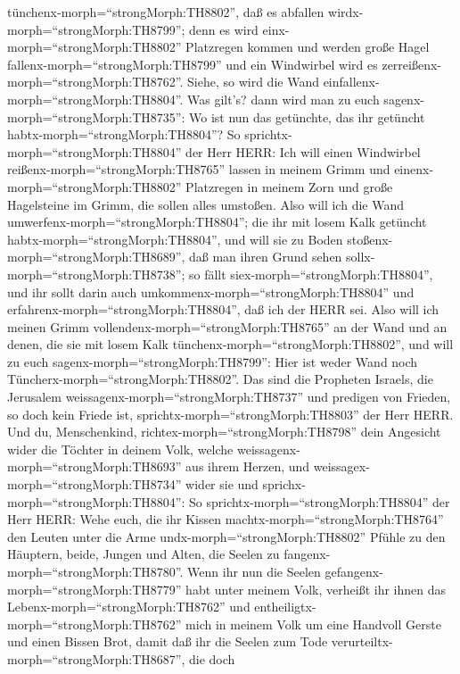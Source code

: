 tünchenx-morph=``strongMorph:TH8802'', daß es abfallen
wirdx-morph=``strongMorph:TH8799''; denn es wird
einx-morph=``strongMorph:TH8802'' Platzregen kommen und werden große
Hagel fallenx-morph=``strongMorph:TH8799'' und ein Windwirbel wird es
zerreißenx-morph=``strongMorph:TH8762''.  Siehe, so wird
die Wand einfallenx-morph=``strongMorph:TH8804''. Was gilt's? dann wird
man zu euch sagenx-morph=``strongMorph:TH8735'': Wo ist nun das
getünchte, das ihr getüncht habtx-morph=``strongMorph:TH8804''?
 So sprichtx-morph=``strongMorph:TH8804'' der Herr HERR:
Ich will einen Windwirbel reißenx-morph=``strongMorph:TH8765'' lassen in
meinem Grimm und einenx-morph=``strongMorph:TH8802'' Platzregen in
meinem Zorn und große Hagelsteine im Grimm, die sollen alles umstoßen.
 Also will ich die Wand
umwerfenx-morph=``strongMorph:TH8804''; die ihr mit losem Kalk getüncht
habtx-morph=``strongMorph:TH8804'', und will sie zu Boden
stoßenx-morph=``strongMorph:TH8689'', daß man ihren Grund sehen
sollx-morph=``strongMorph:TH8738''; so fällt
siex-morph=``strongMorph:TH8804'', und ihr sollt darin auch
umkommenx-morph=``strongMorph:TH8804'' und
erfahrenx-morph=``strongMorph:TH8804'', daß ich der HERR sei.
 Also will ich meinen Grimm
vollendenx-morph=``strongMorph:TH8765'' an der Wand und an denen, die
sie mit losem Kalk tünchenx-morph=``strongMorph:TH8802'', und will zu
euch sagenx-morph=``strongMorph:TH8799'': Hier ist weder Wand noch
Tüncherx-morph=``strongMorph:TH8802''.  Das sind die
Propheten Israels, die Jerusalem weissagenx-morph=``strongMorph:TH8737''
und predigen von Frieden, so doch kein Friede ist,
sprichtx-morph=``strongMorph:TH8803'' der Herr HERR.  Und
du, Menschenkind, richtex-morph=``strongMorph:TH8798'' dein Angesicht
wider die Töchter in deinem Volk, welche
weissagenx-morph=``strongMorph:TH8693'' aus ihrem Herzen, und
weissagex-morph=``strongMorph:TH8734'' wider sie  und
sprichx-morph=``strongMorph:TH8804'': So
sprichtx-morph=``strongMorph:TH8804'' der Herr HERR: Wehe euch, die ihr
Kissen machtx-morph=``strongMorph:TH8764'' den Leuten unter die Arme
undx-morph=``strongMorph:TH8802'' Pfühle zu den Häuptern, beide, Jungen
und Alten, die Seelen zu fangenx-morph=``strongMorph:TH8780''. Wenn ihr
nun die Seelen gefangenx-morph=``strongMorph:TH8779'' habt unter meinem
Volk, verheißt ihr ihnen das Lebenx-morph=``strongMorph:TH8762''
 und entheiligtx-morph=``strongMorph:TH8762'' mich in
meinem Volk um eine Handvoll Gerste und einen Bissen Brot, damit daß ihr
die Seelen zum Tode verurteiltx-morph=``strongMorph:TH8687'', die doch

